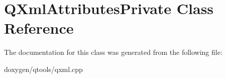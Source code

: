 \hypertarget{class_q_xml_attributes_private}{}\section{Q\+Xml\+Attributes\+Private Class Reference}
\label{class_q_xml_attributes_private}


The documentation for this class was generated from the following file\+:\begin{DoxyCompactItemize}
\item 
doxygen/qtools/qxml.\+cpp\end{DoxyCompactItemize}
